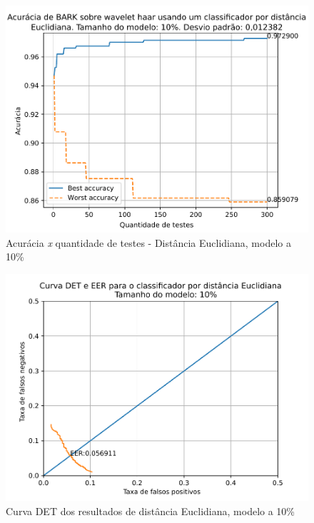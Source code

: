			\FloatBarrier

			\begin{figure}[H]
				\centering
				\includegraphics[width=.9\linewidth]{images/results/confusionMatrices/classifier_Euclidian_10}
				\caption{Acurácia \textit{x} quantidade de testes - Distância Euclidiana, modelo a 10\%}
				\label{fig:classifiereuclidian10}
			\end{figure}

			\begin{figure}[H]
				\centering
				\includegraphics[width=.9\linewidth]{images/results/det/DET_for_classifier_Euclidian_10}
				\caption{Curva DET dos resultados de distância Euclidiana, modelo a 10\%}
				\label{fig:detforclassifiereuclidian10}
			\end{figure}
			
